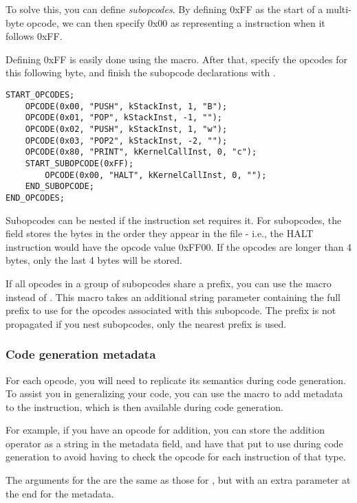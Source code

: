 To solve this, you can define \emph{subopcodes}. By defining 0xFF as the start of a multi-byte opcode, we can then specify 0x00 as representing a  instruction when it follows 0xFF.

Defining 0xFF is easily done using the  macro. After that, specify the opcodes for this following byte, and finish the subopcode declarations with .

\begin{C++}
\begin{lstlisting}
START_OPCODES;
	OPCODE(0x00, "PUSH", kStackInst, 1, "B");
	OPCODE(0x01, "POP", kStackInst, -1, "");
	OPCODE(0x02, "PUSH", kStackInst, 1, "w");
	OPCODE(0x03, "POP2", kStackInst, -2, "");
	OPCODE(0x80, "PRINT", kKernelCallInst, 0, "c");
	START_SUBOPCODE(0xFF);
		OPCODE(0x00, "HALT", kKernelCallInst, 0, "");
	END_SUBOPCODE;
END_OPCODES;
\end{lstlisting}
\end{C++}

Subopcodes can be nested if the instruction set requires it. For subopcodes, the  field stores the bytes in the order they appear in the file - i.e., the HALT instruction would have the opcode value 0xFF00. If the opcodes are longer than 4 bytes, only the last 4 bytes will be stored.

If all opcodes in a group of subopcodes share a prefix, you can use the  macro instead of . This macro takes an additional string parameter containing the full prefix to use for the opcodes associated with this subopcode. The prefix is not propagated if you nest subopcodes, only the nearest prefix is used.

\subsubsection{Code generation metadata}
For each opcode, you will need to replicate its semantics during code generation. To assist you in generalizing your code, you can use the  macro to add metadata to the instruction, which is then available during code generation.

For example, if you have an opcode for addition, you can store the addition operator as a string in the metadata field, and have that put to use during code generation to avoid having to check the opcode for each instruction of that type.

The arguments for the  are the same as those for , but with an extra parameter at the end for the metadata.

